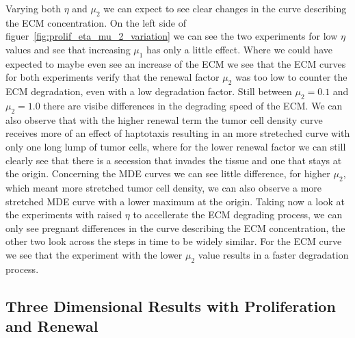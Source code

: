Varying both $\eta$ and $\mu_2$ we can expect to see clear changes in the curve describing the ECM concentration. On the left side of figuer~\ref{fig:prolif_eta_mu_2_variation} we can see the two experiments for low $\eta$ values and see that increasing $\mu_1$ has only a little effect. Where we could have expected to maybe even see an increase of the ECM we see that the ECM curves for both experiments verify that the renewal factor $\mu_2$ was too low to counter the ECM degradation, even with a low degradation factor. Still between $\mu_2=0.1$ and $\mu_2=1.0$ there are visibe differences in the degrading speed of the ECM. We can also observe that with the higher renewal term the tumor cell density curve receives more of an effect of haptotaxis resulting in an more streteched curve with only one long lump of tumor cells, where for the lower renewal factor we can still clearly see that there is a secession that invades the tissue and one that stays at the origin. Concerning the MDE curves we can see little difference, for higher $\mu_2$, which meant more stretched tumor cell density, we can also observe a more stretched MDE curve with a lower maximum at the origin. \newline 
Taking now a look at the experiments with raised $\eta$ to accellerate the ECM degrading process, we can only see pregnant differences in the curve describing the ECM concentration, the other two look across the steps in time to be widely similar. For the ECM curve we see that the experiment with the lower $\mu_2$ value results in a faster degradation process.




\subsection{Three Dimensional Results with Proliferation and Renewal}
\lipsum[1-3]




